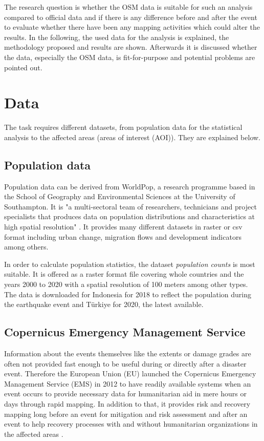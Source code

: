 \documentclass[oneside,twocolumn,10pt,cleanfoot,cleanhead]{asme2ej}
\begin{document}
The research question is whether the OSM data is suitable for such an analysis compared to official data and if there is any difference before and after the event to evaluate whether there have been any mapping activities which could alter the results.
In the following, the used data for the analysis is explained, the methodology proposed and results are shown. 
Afterwards it is discussed whether the data, especially the OSM data, is fit-for-purpose and potential problems are pointed out.


\section{Data}

The task requires different datasets, from population data for the statistical analysis to the affected areas (areas of interest (AOI)). They are explained below.

\subsection{Population data}

Population data can be derived from WorldPop, a research programme based in the School of Geography and Environmental Sciences at the University of Southampton. 
It is "a multi-sectoral team of researchers, technicians and project specialists that produces data on population distributions and characteristics at high spatial resolution" \cite{WorldPop2023}.
It provides many different datasets in raster or csv format including urban change, migration flows and development indicators among others. 

In order to calculate population statistics, the dataset \textit{population counts} is most suitable. 
It is offered as a raster format file covering whole countries and the years 2000 to 2020 with a spatial resolution of 100 meters among other types.
The data is downloaded for Indonesia for 2018 to reflect the population during the earthquake event and Türkiye for 2020, the latest available.

\subsection{Copernicus Emergency Management Service}

Information about the events themselves like the extents or damage grades are often not provided fast enough to be useful during or directly after a disaster event.
Therefore the European Union (EU) launched the Copernicus Emergency Management Service (EMS) in 2012 to have readily available systems when an event occurs to provide necessary data for humanitarian aid in mere hours or days through rapid mapping.
In addition to that, it provides risk and recovery mapping long before an event for mitigation and risk assessment and after an event to help recovery processes with and without humanitarian organizations in the affected areas \cite{Copernicus2023}.
\end{document}
